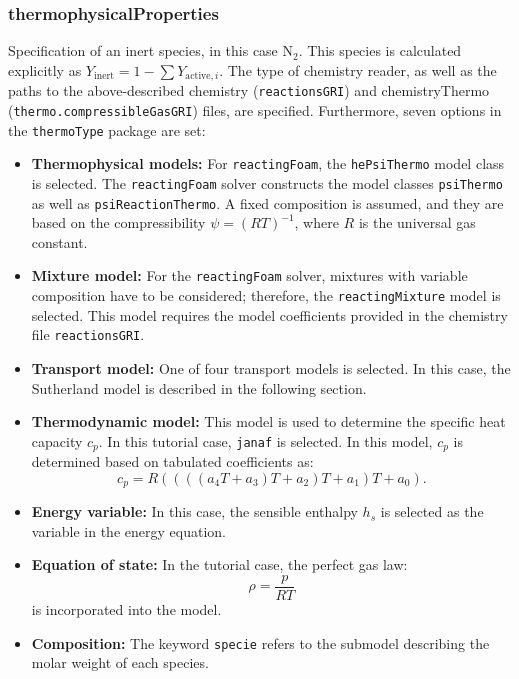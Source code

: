 \subsubsection*{thermophysicalProperties}
Specification of an inert species, in this case $\mathrm{N}_2$. This species is calculated explicitly as $Y_{\text{inert}} = 1 - \sum Y_{\text{active},i}$. The type of chemistry reader, as well as the paths to the above-described chemistry (\texttt{reactionsGRI}) and chemistryThermo (\texttt{thermo.compressibleGasGRI}) files, are specified. Furthermore, seven options in the \texttt{thermoType} package are set:

\begin{itemize}
    \item \textbf{Thermophysical models:} For \texttt{reactingFoam}, the \texttt{hePsiThermo} model class is selected. The \texttt{reactingFoam} solver constructs the model classes \texttt{psiThermo} as well as \texttt{psiReactionThermo}. A fixed composition is assumed, and they are based on the compressibility $\psi = (RT)^{-1}$, where $R$ is the universal gas constant.
    \item \textbf{Mixture model:} For the \texttt{reactingFoam} solver, mixtures with variable composition have to be considered; therefore, the \texttt{reactingMixture} model is selected. This model requires the model coefficients provided in the chemistry file \texttt{reactionsGRI}.
    \item \textbf{Transport model:} One of four transport models is selected. In this case, the Sutherland model is described in the following section.
    \item \textbf{Thermodynamic model:} This model is used to determine the specific heat capacity $c_p$. In this tutorial case, \texttt{janaf} is selected. In this model, $c_p$ is determined based on tabulated coefficients as:
    \begin{equation}
    c_p = R \left( \left( \left( \left( a_4 T + a_3 \right) T + a_2 \right) T + a_1 \right) T + a_0 \right).
    \end{equation}
    \item \textbf{Energy variable:} In this case, the sensible enthalpy $h_s$ is selected as the variable in the energy equation.
    \item \textbf{Equation of state:} In the tutorial case, the perfect gas law:
    \begin{equation}
    \rho = \frac{p}{RT}
    \end{equation}
    is incorporated into the model.
    \item \textbf{Composition:} The keyword \texttt{specie} refers to the submodel describing the molar weight of each species.
\end{itemize}

